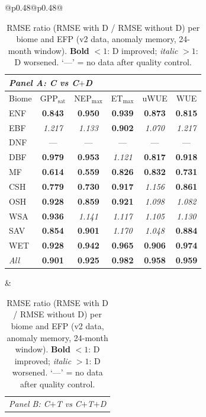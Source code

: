 \begin{table}[htbp]
\centering
\caption{RMSE ratio (RMSE with D / RMSE without D) per biome and EFP
(v2 data, anomaly memory, 24-month window). \textbf{Bold} $<1$: D improved;
\textit{italic} $>1$: D worsened. `---' = no data after quality control.}
\label{tab:rmse_ratio_v2}
\begin{tabular}{@{}p{0.48\linewidth}@{\hspace{0.04\linewidth}}p{0.48\linewidth}@{}}
\footnotesize
\setlength{\tabcolsep}{3.5pt}
\renewcommand{\arraystretch}{1.06}
\begin{tabular}{lccccc}
\toprule
\multicolumn{6}{l}{\textit{Panel A: C vs C$+$D}} \\
\midrule
Biome & GPP$_\mathrm{sat}$ & NEP$_\mathrm{max}$ & ET$_\mathrm{max}$ & uWUE & WUE \\
\midrule
ENF & \textbf{0.843} & \textbf{0.950} & \textbf{0.939} & \textbf{0.873} & \textbf{0.815} \\
EBF & \textit{1.217} & \textit{1.133} & \textbf{0.902} & \textit{1.070} & \textit{1.217} \\
DNF & --- & --- & --- & --- & --- \\
DBF & \textbf{0.979} & \textbf{0.953} & \textit{1.121} & \textbf{0.817} & \textbf{0.918} \\
MF & \textbf{0.614} & \textbf{0.559} & \textbf{0.826} & \textbf{0.832} & \textbf{0.731} \\
CSH & \textbf{0.779} & \textbf{0.730} & \textbf{0.917} & \textit{1.156} & \textbf{0.861} \\
OSH & \textbf{0.928} & \textbf{0.859} & \textbf{0.921} & \textit{1.098} & \textit{1.082} \\
WSA & \textbf{0.936} & \textit{1.141} & \textit{1.117} & \textit{1.105} & \textit{1.130} \\
SAV & \textbf{0.854} & \textbf{0.901} & \textit{1.170} & \textit{1.048} & \textbf{0.884} \\
WET & \textbf{0.928} & \textbf{0.942} & \textbf{0.965} & \textbf{0.906} & \textbf{0.974} \\
\midrule
\textit{All} & \textbf{0.901} & \textbf{0.925} & \textbf{0.982} & \textbf{0.958} & \textbf{0.959} \\
\bottomrule
\end{tabular} &
\footnotesize
\setlength{\tabcolsep}{3.5pt}
\renewcommand{\arraystretch}{1.06}
\begin{tabular}{lccccc}
\toprule
\multicolumn{6}{l}{\textit{Panel B: C$+$T vs C$+$T$+$D}} \\

\end{tabular}
\end{tabular}
\end{table}
